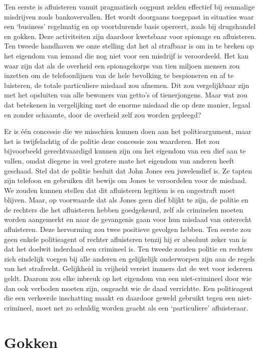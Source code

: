 \documentclass[
  a5paper,
  smalldemyvopaper,10pt,twoside,onecolumn,openright,extrafontsizes,hidelinks]{memoir}
\begin{document}
Ten eerste is afluisteren vanuit pragmatisch oogpunt zelden effectief
bij eenmalige misdrijven zoals bankovervallen. Het wordt doorgaans
toegepast in situaties waar een `business' regelmatig en op voortdurende
basis opereert, zoals bij drugshandel en gokken. Deze activiteiten zijn
daardoor kwetsbaar voor spionage en afluisteren. Ten tweede handhaven we
onze stelling dat het al strafbaar is om in te breken op het eigendom
van iemand die nog niet voor een misdrijf is veroordeeld. Het kan waar
zijn dat als de overheid een spionagekorps van tien miljoen mensen zou
inzetten om de telefoonlijnen van de hele bevolking te bespioneren en af
te luisteren, de totale particuliere misdaad zou afnemen. Dit zou
vergelijkbaar zijn met het opsluiten van alle bewoners van getto's of
tienerjongens. Maar wat zou dat betekenen in vergelijking met de enorme
misdaad die op deze manier, legaal en zonder schaamte, door de overheid
zelf zou worden gepleegd?

Er is één concessie die we misschien kunnen doen aan het
politieargument, maar het is twijfelachtig of de politie deze concessie
zou waarderen. Het zou bijvoorbeeld gerechtvaardigd kunnen zijn om het
eigendom van een dief aan te vallen, omdat diegene in veel grotere mate
het eigendom van anderen heeft geschaad. Stel dat de politie besluit dat
John Jones een juwelendief is. Ze tapten zijn telefoon en gebruiken dit
bewijs om Jones te veroordelen voor de misdaad. We zouden kunnen stellen
dat dit afluisteren legitiem is en ongestraft moet blijven. Maar, op
voorwaarde dat als Jones geen dief blijkt te zijn, de politie en de
rechters die het afluisteren hebben goedgekeurd, zelf als criminelen
moeten worden aangemerkt en naar de gevangenis gaan voor hun misdaad van
onterecht afluisteren. Deze hervorming zou twee positieve gevolgen
hebben. Ten eerste zou geen enkele politieagent of rechter afluisteren
tenzij hij er absoluut zeker van is dat het doelwit inderdaad een
crimineel is. Ten tweede zouden politie en rechters zich eindelijk
voegen bij alle anderen en gelijkelijk onderworpen zijn aan de regels
van het strafrecht. Gelijkheid in vrijheid vereist immers dat de wet
voor iedereen geldt. Daarom zou elke inbreuk op het eigendom van een
niet-crimineel door wie dan ook verboden moeten zijn, ongeacht wie de
daad verrichtte. Een politieagent die een verkeerde inschatting maakt en
daardoor geweld gebruikt tegen een niet-crimineel, moet net zo schuldig
worden geacht als een `particuliere' afluisteraar.

\section{Gokken}\label{gokken}
\end{document}
